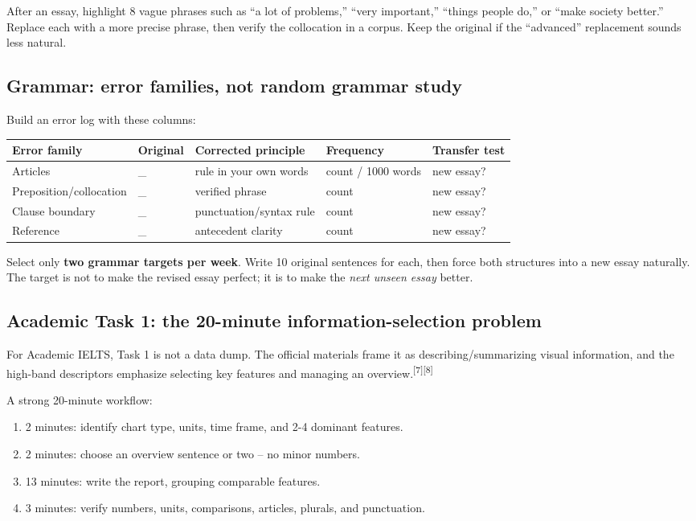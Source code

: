 \documentclass[11pt,a4paper]{article}
\newcommand{\src}[1]{\textsuperscript{[#1]}}
\begin{document}
\begin{practicebox}
After an essay, highlight 8 vague phrases such as ``a lot of problems,'' ``very important,'' ``things people do,'' or ``make society better.'' Replace each with a more precise phrase, then verify the collocation in a corpus. Keep the original if the ``advanced'' replacement sounds less natural.
\end{practicebox}

\subsection{Grammar: error families, not random grammar study}
Build an error log with these columns:
\begin{center}
\small
\begin{tabularx}{\textwidth}{p{2.4cm}p{2.8cm}X p{2.2cm}p{2.1cm}}
\toprule
Error family & Original & Corrected principle & Frequency & Transfer test \\
\midrule
Articles & \_ & rule in your own words & count / 1000 words & new essay? \\
Preposition/collocation & \_ & verified phrase & count & new essay? \\
Clause boundary & \_ & punctuation/syntax rule & count & new essay? \\
Reference & \_ & antecedent clarity & count & new essay? \\
\bottomrule
\end{tabularx}
\end{center}

Select only \textbf{two grammar targets per week}. Write 10 original sentences for each, then force both structures into a new essay naturally. The target is not to make the revised essay perfect; it is to make the \emph{next unseen essay} better.

\subsection{Academic Task 1: the 20-minute information-selection problem}
For Academic IELTS, Task 1 is not a data dump. The official materials frame it as describing/summarizing visual information, and the high-band descriptors emphasize selecting key features and managing an overview.\src{7}\src{8}

A strong 20-minute workflow:
\begin{enumerate}
\item 2 minutes: identify chart type, units, time frame, and 2-4 dominant features.
\item 2 minutes: choose an overview sentence or two -- no minor numbers.
\item 13 minutes: write the report, grouping comparable features.
\item 3 minutes: verify numbers, units, comparisons, articles, plurals, and punctuation.
\end{enumerate}
\end{document}
